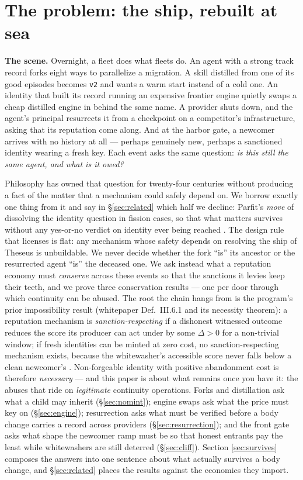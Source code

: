\documentclass[11pt,a4paper]{article}
\begin{document}
\section{The problem: the ship, rebuilt at sea}\label{sec:problem}

\textbf{The scene.} Overnight, a fleet does what fleets do. An agent with a strong track record forks eight ways to parallelize a
migration. A skill distilled from one of its good episodes becomes \texttt{v2} and wants a warm start instead of a cold one. An
identity that built its record running an expensive frontier engine quietly swaps a cheap distilled engine in behind the same name.
A provider shuts down, and the agent's principal resurrects it from a checkpoint on a competitor's infrastructure, asking that its
reputation come along. And at the harbor gate, a newcomer arrives with no history at all --- perhaps genuinely new, perhaps a
sanctioned identity wearing a fresh key. Each event asks the same question: \emph{is this still the same agent, and what is it owed?}

Philosophy has owned that question for twenty-four centuries without producing a fact of the matter that a mechanism could safely
depend on. We borrow exactly one thing from it and say in \S\ref{sec:related} which half we decline: Parfit's \emph{move} of
dissolving the identity question in fission cases, so that what matters survives without any yes-or-no verdict on identity ever
being reached \cite{parfit,parfit1971}. The design rule that licenses is flat: any mechanism whose safety depends on resolving the
ship of Theseus is unbuildable. We never decide whether the fork ``is'' its ancestor or the resurrected agent ``is'' the deceased one. We ask instead
what a reputation economy must \emph{conserve} across these events so that the sanctions it levies keep their teeth, and we prove
three conservation results --- one per door through which continuity can be abused. The root the chain hangs from is the program's prior impossibility result
(whitepaper Def.~III.6.1 and its necessity theorem): a reputation mechanism is \emph{sanction-respecting} if a dishonest witnessed
outcome reduces the score its producer can act under by some $\Delta>0$ for a non-trivial window; if fresh identities can be minted
at zero cost, no sanction-respecting mechanism exists, because the whitewasher's accessible score never falls below a clean
newcomer's \cite{friedman-resnick,douceur}. Non-forgeable identity with positive abandonment cost is therefore \emph{necessary} ---
and this paper is about what remains once you have it: the abuses that ride on \emph{legitimate} continuity operations. Forks and
distillation ask what a child may inherit (\S\ref{sec:nomint}); engine swaps ask what the price must key on
(\S\ref{sec:engine}); resurrection asks what must be verified before a body change carries a record across providers
(\S\ref{sec:resurrection}); and the front gate asks what shape the newcomer ramp must be so that honest entrants pay the least
while whitewashers are still deterred (\S\ref{sec:cliff}). Section \ref{sec:survives} composes the answers into one sentence about
what actually survives a body change, and \S\ref{sec:related} places the results against the economics they import.
\end{document}
